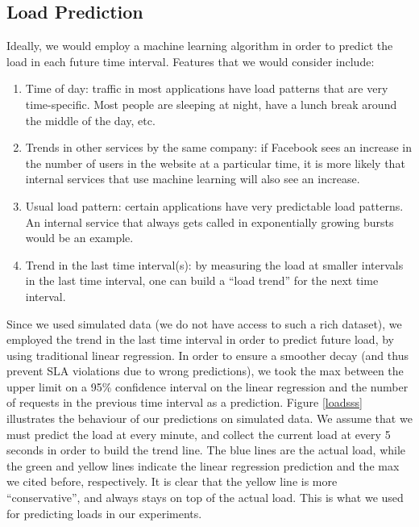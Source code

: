 \documentclass[12pt]{article}
\begin{document}
\subsection{Load Prediction}
Ideally, we would employ a machine learning algorithm in order to predict the
load in each future time interval. Features that we would consider include:
\begin{enumerate}
\item Time of day: traffic in most applications have load patterns that are very
time-specific. Most people are sleeping at night, have a lunch break around the
middle of the day, etc.
\item Trends in other services by the same company: if Facebook sees an increase
in the number of users in the website at a particular time, it is more likely
that internal services that use machine learning will also see an increase.
\item Usual load pattern: certain applications have very predictable load
patterns. An internal service that always gets called in exponentially growing
bursts would be an example.
\item Trend in the last time interval(s): by measuring the load at smaller
intervals in the last time interval, one can build a ``load trend'' for the next
time interval.
\end{enumerate}
Since we used simulated data (we do not have access to such a rich dataset), we
employed the trend in the last time interval in order to predict future load, by
using traditional linear regression. In order to ensure a smoother decay (and
thus prevent SLA violations due to wrong predictions), we took the max between the upper limit
on a 95\% confidence interval on the linear regression and the number of
requests in the previous time interval as a prediction. Figure \ref{loadsss}
illustrates the behaviour of our predictions on simulated data. We assume that
we must predict the load at every minute, and collect the current load at every
5 seconds in order to build the trend line. The blue lines are the actual load,
while the green and yellow lines indicate the linear regression prediction and
the max we cited before, respectively. It is clear that the yellow line is more
``conservative'', and always stays on top of the actual load. This is what we
used for predicting loads in our experiments.
\end{document}
